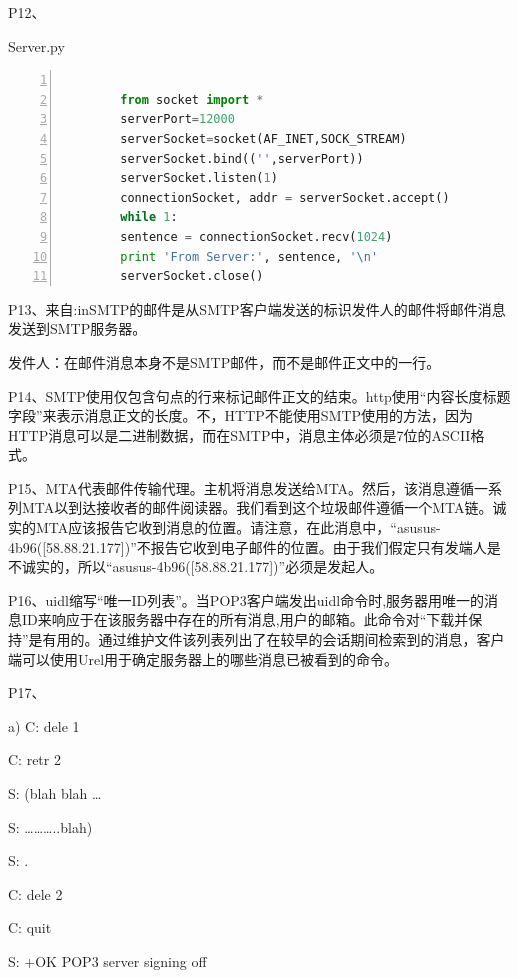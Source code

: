 \documentclass[11pt,UTF8,twoside]{article}
\begin{document}
	P12、
	
	Server.py 
	    \begin{tcolorbox}  

		\begin{lstlisting}[language={python},numbers=left,title=Server.py,%frame=shadowbox,	rulesepcolor=\color{red!20!green!20!blue!20}, keywordstyle=\color{blue!70!black}, 
commentstyle=\color{blue!90!}, basicstyle=\ttfamily]  

		from socket import * 
		serverPort=12000 
		serverSocket=socket(AF_INET,SOCK_STREAM) 
		serverSocket.bind(('',serverPort)) 
		serverSocket.listen(1) 
		connectionSocket, addr = serverSocket.accept() 
		while 1: 
		sentence = connectionSocket.recv(1024) 
		print 'From Server:', sentence, '\n' 
		serverSocket.close() 
		\end{lstlisting}  

	\end{tcolorbox}  
	
	P13、来自:inSMTP的邮件是从SMTP客户端发送的标识发件人的邮件将邮件消息发送到SMTP服务器。
	
	发件人：在邮件消息本身不是SMTP邮件，而不是邮件正文中的一行。
	
	P14、SMTP使用仅包含句点的行来标记邮件正文的结束。http使用“内容长度标题字段”来表示消息正文的长度。不，HTTP不能使用SMTP使用的方法，因为HTTP消息可以是二进制数据，而在SMTP中，消息主体必须是7位的ASCII格式。
	
	P15、MTA代表邮件传输代理。主机将消息发送给MTA。然后，该消息遵循一系列MTA以到达接收者的邮件阅读器。我们看到这个垃圾邮件遵循一个MTA链。诚实的MTA应该报告它收到消息的位置。请注意，在此消息中，“asusus-4b96([58.88.21.177])”不报告它收到电子邮件的位置。由于我们假定只有发端人是不诚实的，所以“asusus-4b96([58.88.21.177])”必须是发起人。
	
	P16、uidl缩写“唯一ID列表”。当POP3客户端发出uidl命令时,服务器用唯一的消息ID来响应于在该服务器中存在的所有消息,用户的邮箱。此命令对“下载并保持”是有用的。通过维护文件该列表列出了在较早的会话期间检索到的消息，客户端可以使用Urel用于确定服务器上的哪些消息已被看到的命令。
	
	P17、
	
	a) C: dele 1 
	
	C: retr 2 
	
	S: (blah blah … 
	
	S: ………..blah) 
	
	S: . 
	
	C: dele 2 
	
	C: quit 
	
	S: +OK POP3 server signing off 
	
\end{document}
